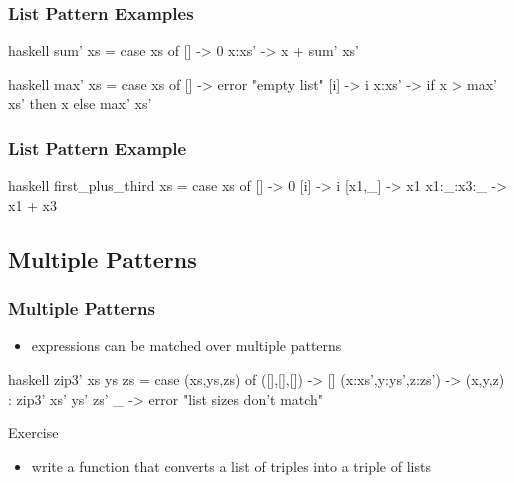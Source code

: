 \documentclass[dvipsnames]{beamer}
\theoremstyle{plain}
\begin{document}
\begin{frame}[fragile]
  \frametitle{List Pattern Examples}

  \begin{example}
    \begin{pygments}{haskell}
sum' xs =
    case xs of
      [] -> 0
      x:xs' -> x + sum' xs'
    \end{pygments}
  \end{example}

  \pause
  \begin{example}
    \begin{pygments}{haskell}
max' xs =
    case xs of
      [] -> error "empty list"
      [i] -> i
      x:xs' -> if x > max' xs' then x else max' xs'
    \end{pygments}
  \end{example}
\end{frame}

\begin{frame}[fragile]
  \frametitle{List Pattern Example}

  \begin{example}
    \pause
    \begin{pygments}{haskell}
first_plus_third xs =
    case xs of
      [] -> 0
      [i] -> i
      [x1,_] -> x1
      x1:_:x3:_ -> x1 + x3
    \end{pygments}
  \end{example}
\end{frame}

\subsection{Multiple Patterns}

\begin{frame}[fragile]
  \frametitle{Multiple Patterns}

  \begin{itemize}
    \item expressions can be matched over multiple patterns
  \end{itemize}

  \begin{example}
    \pause
    \begin{pygments}{haskell}
zip3' xs ys zs =
    case (xs,ys,zs) of
      ([],[],[]) -> []
      (x:xs',y:ys',z:zs') -> (x,y,z) : zip3' xs' ys' zs'
      _ -> error "list sizes don't match"
    \end{pygments}
  \end{example}

  \pause
  \begin{block}{Exercise}
    \begin{itemize}
      \item write a function that converts a list of triples into a triple of
        lists
    \end{itemize}
  \end{block}
\end{frame}
\end{document}
